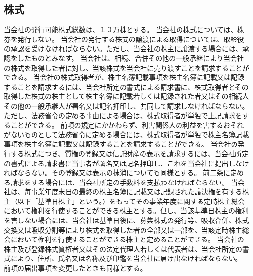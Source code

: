 \documentclass[10pt,a4paper,uplatex]{jsarticle}
\begin{document}
\subsection{株式}
当会社の発行可能株式総数は、１０万株とする。
当会社の株式については、株券を発行しない。
当会社の発行する株式の譲渡による取得については、取締役の承認を受けなければならない。ただし、当会社の株主に譲渡する場合には、承認をしたものとみなす。
当会社は、相続、合併その他の一般承継により当会社の株式を取得した者に対し、当該株式を当会社に売り渡すことを請求することができる。
当会社の株式取得者が、株主名簿記載事項を株主名簿に記載又は記録することを請求するには、当会社所定の書式による請求書に、株式取得者とその取得した株式の株主として株主名簿に記載若しくは記録された者又はその相続人その他の一般承継人が署名又は記名押印し、共同して請求しなければならない。ただし、法務省令の定める事由による場合は、株式取得者が単独で上記請求をすることができる。
\term 前項の規定にかかわらず、利害関係人の利益を害するおそれがないものとして法務省令に定める場合には、株式取得者が単独で株主名簿記載事項を株主名簿に記載又は記録することを請求することができる。
当会社の発行する株式につき、質権の登録又は信託財産の表示を請求するには、当会社所定の書式による請求書に当事者が署名又は記名押印し、これを当会社に提出しなければならない。その登録又は表示の抹消についても同様とする。
前二条に定める請求をする場合には、当会社所定の手数料を支払わなければならない。
当会社は、毎事業年度末日の最終の株主名簿に記載又は記録された議決権を有する株主（以下「基準日株主」という。）をもってその事業年度に関する定時株主総会において権利を行使することができる株主とする。但し、当該基準日株主の権利を害しない場合には、当会社は基準日後に、募集株式の発行等、吸収合併、株式交換又は吸収分割等により株式を取得した者の全部又は一部を、当該定時株主総会において権利を行使することができる株主と定めることができる。
当会社の株主及び登録株式質権者又はその法定代理人若しくは代表者は、当会社所定の書式により、住所、氏名又は名称及び印鑑を当会社に届け出なければならない。
\term
前項の届出事項を変更したときも同様とする。
\end{document}
